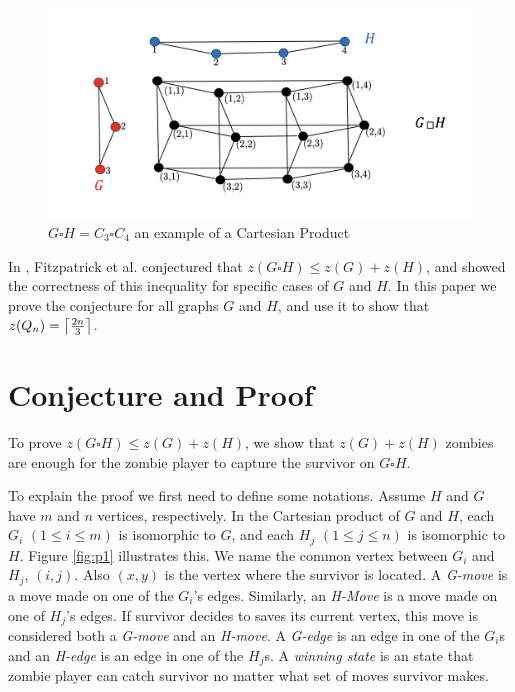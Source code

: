 \documentclass[1p]{elsarticle}
\DeclarePairedDelimiter\ceil{\lceil}{\rceil} \DeclarePairedDelimiter\floor{\lfloor}{\rfloor}
\begin{document}
\begin{figure}[h!]
	\centering
	\includegraphics[width=0.9\linewidth]{fig/CpWest.png}
	\caption{$G \square H = C_3 \square C_4$ an example of a Cartesian Product}
	\label{fig:p2}
\end{figure}

In \cite{Fitz16}, Fitzpatrick et al. conjectured that $z(G \square H) \leq z(G) + z(H)$, and showed the correctness of
this inequality for specific cases of $G$ and $H$. In this paper we prove the conjecture for all graphs $G$ and $H$, and
use it to show that $z(Q_n) =  \ceil*{\frac{2n}{3}}$. 





\section{Conjecture and Proof}\label{conj-proof}

To prove $z(G \square H) \leq z(G) + z(H)$, we show that $z(G) + z(H)$ zombies are enough for the zombie player to
capture the survivor on $G \square H$.

To explain the proof we first need to define some notations. Assume $H$ and $G$ have $m$ and $n$ vertices, respectively.
In the Cartesian product of $G$ and $H$, each $G_{i}$  $(1 \leq i \leq m)$ is isomorphic to $G$, and each $H_{j}$ $(1
\leq j \leq n)$ is isomorphic to $H$. Figure \ref{fig:p1} illustrates this. We name the common vertex between $G_{i}$
and $H_{j}$, $(i,j)$. Also $(x,y)$ is the vertex where the survivor is located. A {\it G-move} is a move made on one of
the $G_{i}$'s edges.  Similarly, an {\it H-Move} is a move made on one of $H_{j}$'s edges. If survivor decides to saves
its current vertex, this move is considered both a {\it G-move} and an {\it H-move}. A {\it G-edge} is an edge in one of
the $G_{i}$s and an {\it H-edge} is an edge in one of the $H_{j}$s. A {\it winning state} is an state that zombie player
can catch survivor no matter what set of moves survivor makes.
\end{document}
